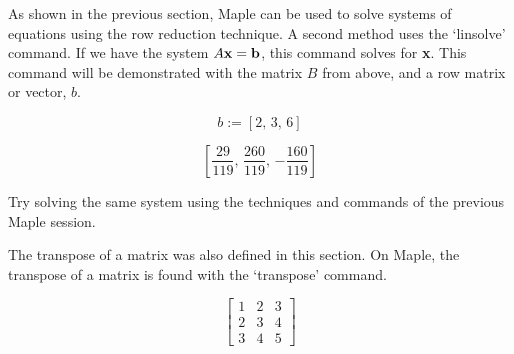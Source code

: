 As shown in the previous section, Maple can be used to solve
systems of equations using the row reduction technique. A second
method uses the `linsolve' command. If we have the system $A{\bf
x}={\bf b}$, this command solves for {\bf x}. This command will be
demonstrated with the matrix $B$ from above, and a row matrix or
vector, $b$.

\bigskip

\begin{maplegroup}
\begin{mapleinput}
\end{mapleinput}

\mapleresult
\begin{maplelatex}
\[
b := [2, \,3, \,6]
\]
\end{maplelatex}

\end{maplegroup}
\begin{maplegroup}
\begin{mapleinput}
\end{mapleinput}

\mapleresult
\begin{maplelatex}
\[
 \left[  \! {\displaystyle \frac {29}{119}} , \,{\displaystyle
\frac {260}{119}} , \,{\displaystyle -\frac {160}{119}}  \!
 \right]
\]
\end{maplelatex}

\end{maplegroup}
\bigskip

Try solving the same system using the techniques and commands of
the previous Maple session.

The transpose of a matrix was also defined in this section. On
Maple, the transpose of a matrix is found with the `transpose'
command.
\bigskip

\begin{maplegroup}
\begin{mapleinput}
\end{mapleinput}

\mapleresult
\begin{maplelatex}
\[
 \left[
{\begin{array}{rrr} 1 & 2 & 3 \\ 2 & 3 & 4 \\ 3 & 4 & 5
\end{array}}
 \right]
\]
\end{maplelatex}

\end{maplegroup}
\begin{maplegroup}
\mapleresult
\begin{maplettyout}
\end{maplettyout}

\end{maplegroup}
\bigskip


